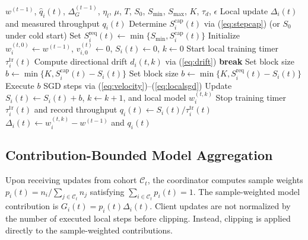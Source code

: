 \documentclass[conference]{IEEEtran}
\begin{document}
\begin{algorithm}[t]
\caption{Capability- and Drift-Aware Local Training}
\label{alg:client}
\begin{algorithmic}[1]
\REQUIRE $w^{(t-1)}$, $\widehat q_i(t)$, $\Delta_G^{(t-1)}$, $\eta_l$, $\mu$, $T$, $S_0$, $S_{\min}$, $S_{\max}$, $K$, $\tau_d$, $\epsilon$
\ENSURE Local update $\Delta_i(t)$ and measured throughput $q_i(t)$
\STATE Determine $S_i^{\mathrm{cap}}(t)$ via (\ref{eq:stepcap}) (or $S_0$ under cold start)
\STATE Set $S_i^{\mathrm{req}}(t) \leftarrow \min\{S_{\min}, S_i^{\mathrm{cap}}(t)\}$
\STATE Initialize $w_i^{(t,0)} \leftarrow w^{(t-1)}$, $v_{i,0}^{(t)} \leftarrow 0$, $S_i(t) \leftarrow 0$, $k \leftarrow 0$
\STATE Start local training timer $\tau_i^{\mathrm{tr}}(t)$
            \STATE Compute directional drift $d_i(t,k)$ via (\ref{eq:drift})
                \STATE \textbf{break} 
            \ENDIF
        \ENDIF
        \STATE Set block size $b \leftarrow \min\{K, S_i^{\mathrm{cap}}(t) - S_i(t)\}$
    \ELSE
        \STATE Set block size $b \leftarrow \min\{K, S_i^{\mathrm{req}}(t) - S_i(t)\}$
    \ENDIF
    \STATE Execute $b$ SGD steps via (\ref{eq:velocity})--(\ref{eq:localsgd})
    \STATE Update $S_i(t) \leftarrow S_i(t) + b$, $k \leftarrow k + 1$, and local model $w_i^{(t,k)}$
\ENDWHILE
\STATE Stop training timer $\tau_i^{\mathrm{tr}}(t)$ and record throughput $q_i(t) \leftarrow S_i(t) / \tau_i^{\mathrm{tr}}(t)$
\RETURN $\Delta_i(t) \leftarrow w_i^{(t,k)} - w^{(t-1)}$ and $q_i(t)$
\end{algorithmic}
\end{algorithm}

\subsection{Contribution-Bounded Model Aggregation}\label{subsec:influence}
Upon receiving updates from cohort $\mathcal{C}_t$, the coordinator computes sample weights $p_i(t) = n_i / \sum_{j \in \mathcal{C}_t} n_j$ satisfying $\sum_{i \in \mathcal{C}_t} p_i(t) = 1$. The sample-weighted model contribution is $G_i(t) = p_i(t) \Delta_i(t)$.  Client updates are not normalized by the number of executed local steps before clipping. Instead, clipping is applied directly to the sample-weighted contributions.
\end{document}
